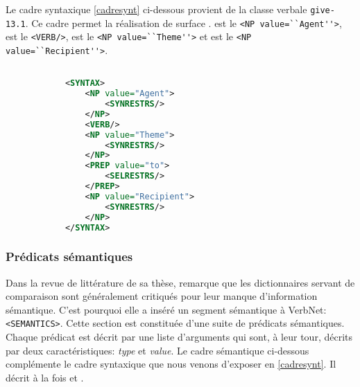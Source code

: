 Le cadre syntaxique \ref{cadresynt} ci-dessous provient de la classe verbale \texttt{give-13.1}. Ce cadre permet la réalisation de surface .  est le \lstinline{<NP value=``Agent''>},  est le \lstinline{<VERB/>},  est le \lstinline{<NP value=``Theme''>} et  est le \lstinline{<NP value=``Recipient''>}.

\begin{lstlisting}[language=Xml, caption = cadres syntaxiques, label=cadresynt]

            <SYNTAX>
                <NP value="Agent">
                    <SYNRESTRS/>
                </NP>
                <VERB/>
                <NP value="Theme">
                    <SYNRESTRS/>
                </NP>
                <PREP value="to">
                    <SELRESTRS/>
                </PREP>
                <NP value="Recipient">
                    <SYNRESTRS/>
                </NP>
            </SYNTAX>
\end{lstlisting}

\subsubsection{Prédicats sémantiques}
Dans la revue de littérature de sa thèse, \cite{SchulerVerbnetBroadcoverageComprehensive2005} remarque que les dictionnaires servant de comparaison sont généralement critiqués pour leur manque d'information sémantique. C'est pourquoi elle a inséré un segment sémantique à VerbNet: \lstinline{<SEMANTICS>}. Cette section est constituée d'une suite de prédicats sémantiques. Chaque prédicat est décrit par une liste d'arguments qui sont, à leur tour, décrits par deux caractéristiques: \emph{type} et \emph{value}. Le cadre sémantique ci-dessous complémente le cadre syntaxique que nous venons d'exposer en \ref{cadresynt}. Il décrit à la fois  et .

